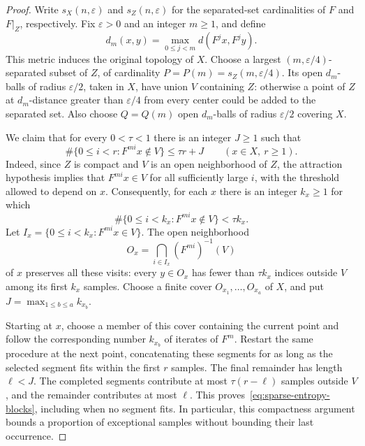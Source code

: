 \begin{proof}
Write $s_X(n,\varepsilon)$ and $s_Z(n,\varepsilon)$ for the separated-set
cardinalities of $F$ and $F|_Z$, respectively.  Fix $\varepsilon>0$ and
an integer $m\geq1$, and define
\[
  d_m(x,y)=\max_{0\leq j<m}d(F^j x,F^j y).
\]
This metric induces the original topology of $X$.  Choose a largest
$(m,\varepsilon/4)$-separated subset of $Z$, of cardinality
$P=P(m)=s_Z(m,\varepsilon/4)$.  Its open $d_m$-balls of radius
$\varepsilon/2$, taken in $X$, have union $V$ containing $Z$: otherwise a
point of $Z$ at $d_m$-distance greater than $\varepsilon/4$ from every
center could be added to the separated set.  Also choose $Q=Q(m)$
open $d_m$-balls of radius $\varepsilon/2$ covering $X$.

We claim that for every $0<\tau<1$ there is an integer $J\geq1$ such
that
\begin{equation}\label{eq:sparse-entropy-blocks}
  \#\{0\leq i<r:F^{mi}x\notin V\}\leq \tau r+J
  \qquad(x\in X,\ r\geq1).
\end{equation}
Indeed, since $Z$ is compact and $V$ is an open neighborhood of $Z$,
the attraction hypothesis implies that $F^{mi}x\in V$ for all
sufficiently large $i$, with the threshold allowed to depend on $x$.
Consequently, for each $x$ there is an integer $k_x\geq1$ for which
\[
  \#\{0\leq i<k_x:F^{mi}x\notin V\}<\tau k_x.
\]
Let $I_x=\{0\leq i<k_x:F^{mi}x\in V\}$.  The open neighborhood
\[
  O_x=\bigcap_{i\in I_x}(F^{mi})^{-1}(V)
\]
of $x$ preserves all these visits: every $y\in O_x$ has fewer than
$\tau k_x$ indices outside $V$ among its first $k_x$ samples.
Choose a finite cover $O_{x_1},\ldots,O_{x_a}$ of $X$, and put
$J=\max_{1\leq b\leq a}k_{x_b}$.

Starting at $x$, choose a member of this cover containing the current
point and follow the corresponding number $k_{x_b}$ of iterates of
$F^m$.  Restart the same procedure at the next point, concatenating
these segments for as long as the selected segment fits within the
first $r$ samples.  The final remainder has length $\ell<J$.
The completed segments contribute at most $\tau(r-\ell)$ samples
outside $V$, and the remainder contributes at most $\ell$.  This
proves~\eqref{eq:sparse-entropy-blocks}, including when no segment
fits.  In particular, this compactness argument bounds a proportion
of exceptional samples without bounding their last occurrence.


\end{proof}
